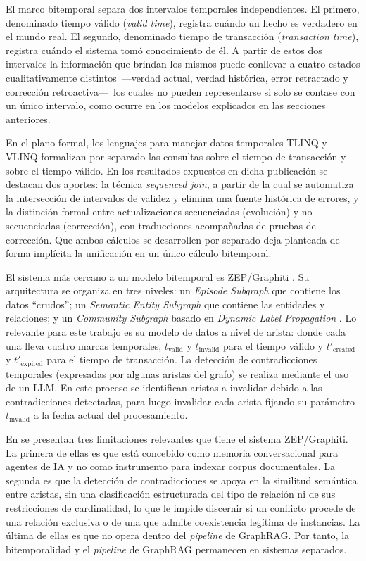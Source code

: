 El marco bitemporal separa dos intervalos temporales independientes. El primero, denominado tiempo válido (\emph{valid time}), registra cuándo un hecho es verdadero en el mundo real. El segundo, denominado tiempo de transacción (\emph{transaction time}), registra cuándo el sistema tomó conocimiento de él. A partir de estos dos intervalos la información que brindan los mismos puede conllevar a cuatro estados cualitativamente distintos~---verdad actual, verdad histórica, error retractado y corrección retroactiva---~los cuales no pueden representarse si solo se contase con un único intervalo, como ocurre en los modelos explicados en las secciones anteriores.

En el plano formal, los lenguajes para manejar datos temporales TLINQ y VLINQ \cite{tlinq_vlinq_placeholder} formalizan por separado las consultas sobre el tiempo de transacción y sobre el tiempo válido. En los resultados expuestos en dicha publicación se destacan dos aportes: la técnica \emph{sequenced join}, a partir de la cual se automatiza la intersección de intervalos de validez y elimina una fuente histórica de errores, y la distinción formal entre actualizaciones secuenciadas (evolución) y no secuenciadas (corrección), con traducciones acompañadas de pruebas de corrección. Que ambos cálculos se desarrollen por separado deja planteada de forma implícita la unificación en un único cálculo bitemporal.

El sistema más cercano a un modelo bitemporal es ZEP/Graphiti \cite{zep2025}. Su arquitectura se organiza en tres niveles: un \emph{Episode Subgraph} que contiene los datos ``crudos''; un \emph{Semantic Entity Subgraph} que contiene las entidades y relaciones; y un \emph{Community Subgraph} basado en \emph{Dynamic Label Propagation} \cite{dynamic_label_propagation_placeholder}. Lo relevante para este trabajo es su modelo de datos a nivel de arista: donde cada una lleva cuatro marcas temporales, $t_{\text{valid}}$ y $t_{\text{invalid}}$ para el tiempo válido y $t'_{\text{created}}$ y $t'_{\text{expired}}$ para el tiempo de transacción. La detección de contradicciones temporales (expresadas por algunas aristas del grafo) se realiza mediante el uso de un LLM. En este proceso se identifican aristas a invalidar debido a las contradicciones detectadas, para luego invalidar cada arista fijando su parámetro $t_{\text{invalid}}$ a la fecha actual del procesamiento.

En \cite{zep2025} se presentan tres limitaciones relevantes que tiene el sistema ZEP/Graphiti. La primera de ellas es que está concebido como memoria conversacional para agentes de IA y no como instrumento para indexar corpus documentales. La segunda es que la detección de contradicciones se apoya en la similitud semántica entre aristas, sin una clasificación estructurada del tipo de relación ni de sus restricciones de cardinalidad, lo que le impide discernir si un conflicto procede de una relación exclusiva o de una que admite coexistencia legítima de instancias. La última de ellas es que no opera dentro del \emph{pipeline} de GraphRAG. Por tanto, la bitemporalidad y el \emph{pipeline} de GraphRAG permanecen en sistemas separados.

